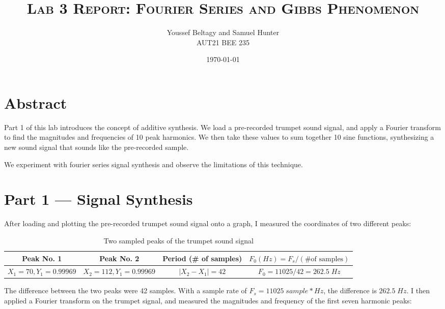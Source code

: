 \documentclass[11pt]{article}
\title{
    \textsc{Lab 3 Report: Fourier Series and Gibbs Phenomenon}
}
\author{
    \Large{Youssef Beltagy and Samuel Hunter} \\
    \large \textsc{AUT21 BEE 235}
}
\date{\today}
\begin{document}
\maketitle %
\pagebreak


\section{Abstract}


Part 1 of this lab introduces the concept of additive synthesis.
We load a pre-recorded trumpet sound signal, and apply a Fourier transform to find the magnitudes and frequencies of 10 peak harmonics.
We then take these values to sum together 10 sine functions, synthesizing a new sound signal that sounds like the pre-recorded sample.


We experiment with fourier series signal synthesis and
observe the limitations of this technique.

\section{Part 1 --- Signal Synthesis}

After loading and plotting the pre-recorded trumpet sound signal onto a graph, I measured the coordinates of two different peaks:

\begin{table}[H]
	\centering
	\begin{tabular}{cccc}\toprule
		Peak No. 1 & Peak No. 2 & Period (\# of samples) & $F_0 (Hz) = F_s / (\textrm{\# of samples})$ \\\midrule

		$X_1 = 70, Y_1 = 0.99969$ &
		$X_2 = 112, Y_1 = 0.99969$ &
		$|X_2-X_1| = 42$ &
		$F_0 = 11025 / 42 = 262.5\;Hz$ \\\bottomrule
	\end{tabular}
	\caption{\label{tab:two-peaks}Two sampled peaks of the trumpet sound signal}
\end{table}

The difference between the two peaks were 42 samples.
With a sample rate of $F_s = 11025\;sample*Hz$, the difference is $262.5\;Hz$.
I then applied a Fourier transform on the trumpet signal, and measured the magnitudes and frequency of the first seven harmonic peaks:
\end{document}
